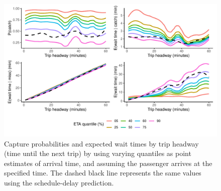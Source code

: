 \begin{knitrout}\small
{}\color{fgcolor}\begin{figure}

{\centering \includegraphics[width=\textwidth]{figure/eta_headway_results-1} 

}

\caption[Capture probabilities and expected wait times by trip headway (time until the next trip) by using varying quantiles as point estimates of arrival time, and assuming the passenger arrives at the specified time]{Capture probabilities and expected wait times by trip headway (time until the next trip) by using varying quantiles as point estimates of arrival time, and assuming the passenger arrives at the specified time. The dashed black line represents the same values using the schedule-delay prediction.}\label{fig:eta_headway_results}
\end{figure}


\end{knitrout}
